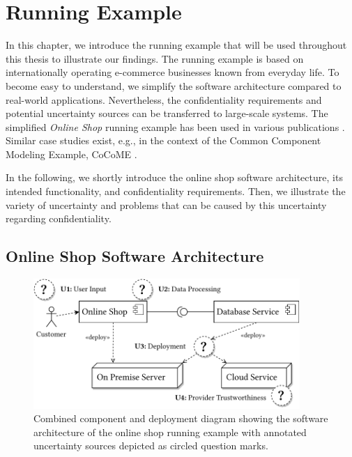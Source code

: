 \chapter{Running Example}%
\label{ch:runningexample}%


In this chapter, we introduce the running example that will be used throughout this thesis to illustrate our findings.
The running example is based on internationally operating e-commerce businesses known from everyday life.
To become easy to understand, we simplify the software architecture compared to real-world applications.
Nevertheless, the confidentiality requirements and potential uncertainty sources can be transferred to large-scale systems.
The simplified \emph{Online Shop} running example has been used in various publications \cite{hahner_modeling_2021,hahner_architecture-based_2023,hahner_model-based_2023}.
Similar case studies exist, e.g., in the context of the Common Component Modeling Example, CoCoME \cite{rausch_common_2008}.

In the following, we shortly introduce the online shop software architecture, its intended functionality, and confidentiality requirements.
Then, we illustrate the variety of uncertainty and problems that can be caused by this uncertainty regarding confidentiality.






\section{Online Shop Software Architecture}%
\label{sec:runningexample:architecture}

\begin{figure}
    \centering
    \includegraphics[width=0.9\textwidth]{figures/chapter3/onlineshop-architecture.pdf}
    \caption[Combined component and deployment diagram of the running example.]{Combined component and deployment diagram showing the software architecture of the online shop running example with annotated uncertainty sources depicted as circled question marks.}
    \label{fig:runningexample:architecture}
\end{figure}

